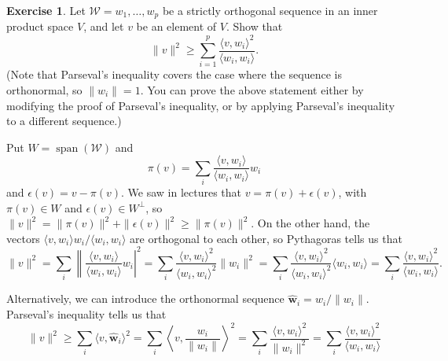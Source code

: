 \documentclass{amsart}
\newcommand{\spn}       {\operatorname{span}}
\newcommand{\ep}        {\epsilon}
\newcommand{\ip}[1]     {\langle #1\rangle}
\newcommand{\hw}        {\widehat{\mathbf{w}}}
\newcommand{\CW}        {{\mathcal{W}}}
\renewcommand{\:}       {\colon}
\theoremstyle{definition}
\newtheorem{exercise}{Exercise}[section]
\renewenvironment{solution}{\SolutionAtEnd}{\endSolutionAtEnd}
\begin{document}
\begin{exercise}
 Let $\CW=w_1,\dotsc,w_p$ be a strictly orthogonal sequence in an
 inner product space $V$, and let $v$ be an element of $V$.  Show that 
 \[ \|v\|^2 \geq \sum_{i=1}^p \frac{\ip{v,w_i}^2}{\ip{w_i,w_i}}. \]
 (Note that Parseval's inequality covers the case where the sequence
 is orthonormal, so $\|w_i\|=1$.  You can prove the above statement
 either by modifying the proof of Parseval's inequality, or by
 applying Parseval's inequality to a different sequence.)
\end{exercise}
\begin{solution}
 Put $W=\spn(\CW)$ and  
 \[ \pi(v) = \sum_i \frac{\ip{v,w_i}}{\ip{w_i,w_i}} w_i \]
 and $\ep(v)=v-\pi(v)$.  We saw in lectures that $v=\pi(v)+\ep(v)$,
 with $\pi(v)\in W$ and $\ep(v)\in W^\perp$, so
 $\|v\|^2=\|\pi(v)\|^2+\|\ep(v)\|^2\geq\|\pi(v)\|^2$.  On the other
 hand, the vectors $\ip{v,w_i}w_i/\ip{w_i,w_i}$ are orthogonal to each
 other, so Pythagoras tells us that
 \[ \|v\|^2 =
     \sum_i \left\| \frac{\ip{v,w_i}}{\ip{w_i,w_i}} w_i\right|^2 = 
     \sum_i \frac{\ip{v,w_i}^2}{\ip{w_i,w_i}^2} \|w_i\|^2 = 
     \sum_i \frac{\ip{v,w_i}^2}{\ip{w_i,w_i}^2} \ip{w_i,w_i} = 
     \sum_i \frac{\ip{v,w_i}^2}{\ip{w_i,w_i}}.
 \]

 Alternatively, we can introduce the orthonormal sequence
 $\hw_i=w_i/\|w_i\|$.  Parseval's inequality tells us that 
 \[ \|v\|^2 \geq \sum_i \ip{v,\hw_i}^2
     = \sum_i \left\langle v,\frac{w_i}{\|w_i\|}\right\rangle^2
     = \sum_i \frac{\ip{v,w_i}^2}{\|w_i\|^2} 
     = \sum_i \frac{\ip{v,w_i}^2}{\ip{w_i,w_i}} 
 \]
\end{solution}
\end{document}
